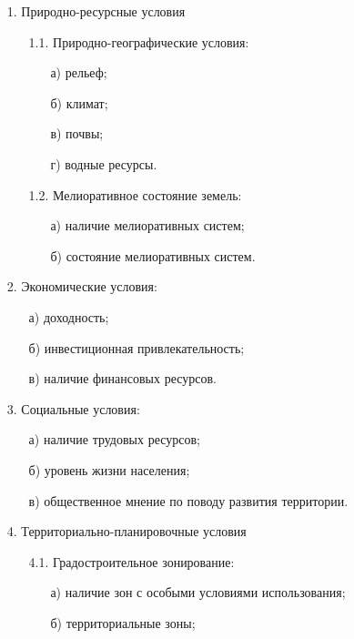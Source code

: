 \begin{enumerate}
    \item[1.] Природно-ресурсные условия
    \begin{enumerate}
        \item[1.1.] Природно-географические условия:
        \begin{enumerate}
            \item[а)] рельеф;
            \item[б)] климат;
            \item[в)] почвы;
            \item[г)] водные ресурсы.
        \end{enumerate}
        \item[1.2.] Мелиоративное состояние земель:
        \begin{enumerate}
            \item[а)] наличие мелиоративных систем;
            \item[б)] состояние мелиоративных систем.
        \end{enumerate}
    \end{enumerate}
    \item[2.] Экономические условия:
    \begin{enumerate}
        \item[а)] доходность;
        \item[б)] инвестиционная привлекательность;
        \item[в)] наличие финансовых ресурсов.
    \end{enumerate}
    \item[3.] Социальные условия:
    \begin{enumerate}
        \item[а)] наличие трудовых ресурсов;
        \item[б)] уровень жизни населения;
        \item[в)] общественное мнение по поводу развития территории.
    \end{enumerate}
    \item[4.] Территориально-планировочные условия
    \begin{enumerate}
        \item[4.1.] Градостроительное зонирование:
        \begin{enumerate}
            \item[а)] наличие зон с особыми условиями использования;
            \item[б)] территориальные зоны;

\end{enumerate}
\end{enumerate}
\end{enumerate}
